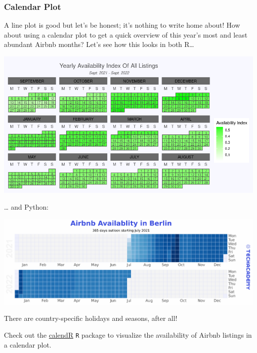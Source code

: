 \documentclass[
  11pt,
]{article}
\newenvironment{tips}[1]
  {
  \begin{itemize}
  \footnotesize
  \renewcommand{\labelitemi}{
    \raisebox{-.7\height}[0pt][0pt]{
      {\setkeys{Gin}{width=3em,keepaspectratio}
        \texttt{[image: images/\#1.png]}}
    }
  }
  \setlength{\fboxsep}{1em}
  \begin{rbox}
  \item
  }
  {
  \end{rbox}
  \end{itemize}
  }
\begin{document}
\hypertarget{calendar-plot}{%
\subsubsection{Calendar Plot}\label{calendar-plot}}

A line plot is good but let's be honest; it's nothing to write home about!
How about using a calendar plot to get a quick overview of this year's most and least abundant Airbnb months?
Let's see how this looks in both R\ldots{}

\begin{center}\includegraphics[width=1\linewidth]{plot/02_r/r_calendar} \end{center}

\ldots{} and Python:

\begin{center}\includegraphics[width=1\linewidth]{plot/01_python/calendar} \end{center}

There are country-specific holidays and seasons, after all!

\begin{tips}r
Check out the \href{https://r-coder.com/calendar-plot-r/}{calendR} \texttt{R} package to visualize the availability of Airbnb listings in a calendar plot.

\end{tips}
\end{document}
